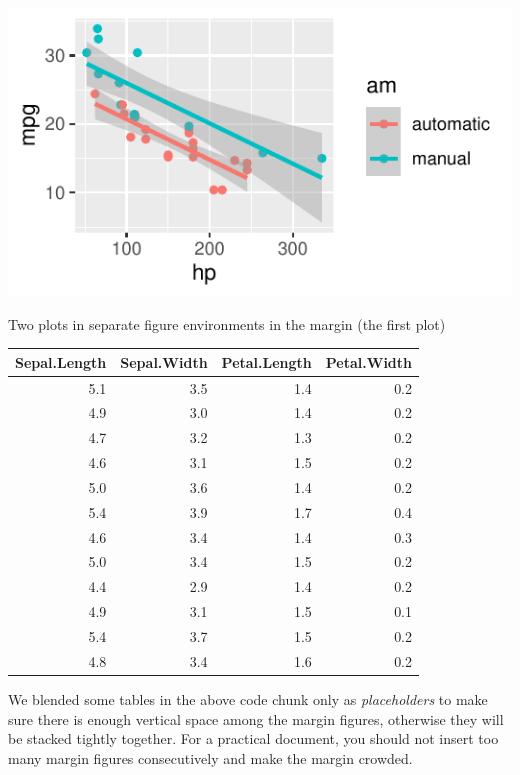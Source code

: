 \documentclass[
  letterpaper,
  DIV=11,
  numbers=noendperiod,
  oneside]{scrartcl}
\begin{document}
\begin{marginfigure}

{\centering \includegraphics{cv_files/figure-pdf/fig-margin-separate-a-2.pdf}

}

\caption{\label{fig-margin-separate-a-2}Two plots in separate figure
environments in the margin (the first plot)}

\end{marginfigure}

\begin{longtable}[]{@{}rrrr@{}}
\toprule()
Sepal.Length & Sepal.Width & Petal.Length & Petal.Width \\
\midrule()
\endhead
5.1 & 3.5 & 1.4 & 0.2 \\
4.9 & 3.0 & 1.4 & 0.2 \\
4.7 & 3.2 & 1.3 & 0.2 \\
4.6 & 3.1 & 1.5 & 0.2 \\
5.0 & 3.6 & 1.4 & 0.2 \\
5.4 & 3.9 & 1.7 & 0.4 \\
4.6 & 3.4 & 1.4 & 0.3 \\
5.0 & 3.4 & 1.5 & 0.2 \\
4.4 & 2.9 & 1.4 & 0.2 \\
4.9 & 3.1 & 1.5 & 0.1 \\
5.4 & 3.7 & 1.5 & 0.2 \\
4.8 & 3.4 & 1.6 & 0.2 \\
\bottomrule()
\end{longtable}

We blended some tables in the above code chunk only as
\emph{placeholders} to make sure there is enough vertical space among
the margin figures, otherwise they will be stacked tightly together. For
a practical document, you should not insert too many margin figures
consecutively and make the margin crowded.
\end{document}

